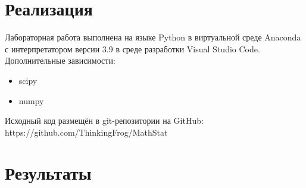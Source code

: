 \documentclass[12pt,a4paper]{article}
\begin{document}
\section{Реализация}
Лабораторная работа выполнена на языке Python в виртуальной среде Anaconda с интерпретатором версии 3.9 в среде разработки Visual Studio Code. Дополнительные зависимости:
\begin{itemize}
    \item scipy
    \item numpy
\end{itemize}

Исходный код размещён в git-репозитории на GitHub: \\ https://github.com/ThinkingFrog/MathStat

\section {Результаты}
\end{document}
